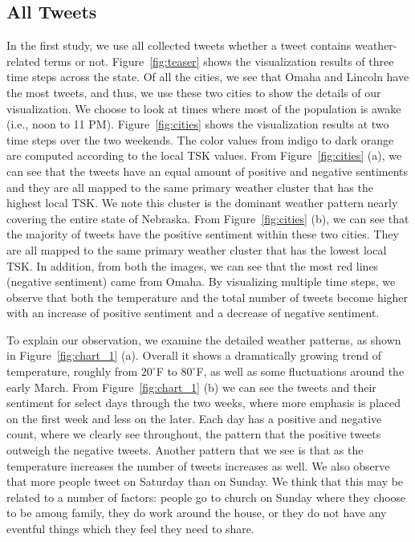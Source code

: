 \subsection{All Tweets}



In the first study, we use all collected tweets whether a tweet contains weather-related terms or not. Figure~\ref{fig:teaser} shows the visualization results of three time steps across the state. 
Of all the cities, we see that Omaha and Lincoln have the most tweets, and thus, we use these two cities to show the details of our visualization. We choose to look at times where most of the population is awake (i.e., noon to 11 PM). Figure~\ref{fig:cities} shows the visualization results at two time steps over the two weekends. The color values from indigo to dark orange are computed according to the local TSK values. From Figure~\ref{fig:cities} (a), we can see that the tweets have an equal amount of positive and negative sentiments and they are all mapped to the same primary weather cluster that has the highest local TSK. We note this cluster is the dominant weather pattern nearly covering the entire state of Nebraska. From Figure~\ref{fig:cities} (b), we can see that the majority of tweets have the positive sentiment within these two cities. They are all mapped to the same primary weather cluster that has the lowest local TSK. In addition, from both the images, we can see that the most red lines (negative sentiment) came from Omaha. By visualizing multiple time steps, we observe that both the temperature and the total number of tweets become higher with an increase of positive sentiment and a decrease of negative sentiment.



To explain our observation, we examine the detailed weather patterns, as shown in Figure~\ref{fig:chart_1} (a). Overall it shows a dramatically growing trend of temperature, roughly from $20^\circ$F to $80^\circ$F, as well as some fluctuations around the early March. From Figure~\ref{fig:chart_1} (b) we can see the tweets and their sentiment for select days through the two weeks, where more emphasis is placed on the first week and less on the later. Each day has a positive and negative count, where we clearly see throughout, the pattern that the positive tweets outweigh the negative tweets. Another pattern that we see is that as the temperature increases the number of tweets increases as well. We also observe that more people tweet on Saturday than on Sunday. We think that this may be related to a number of factors: people go to church on Sunday where they choose to be among family, they do work around the house, or they do not have any eventful things which they feel they need to share.

